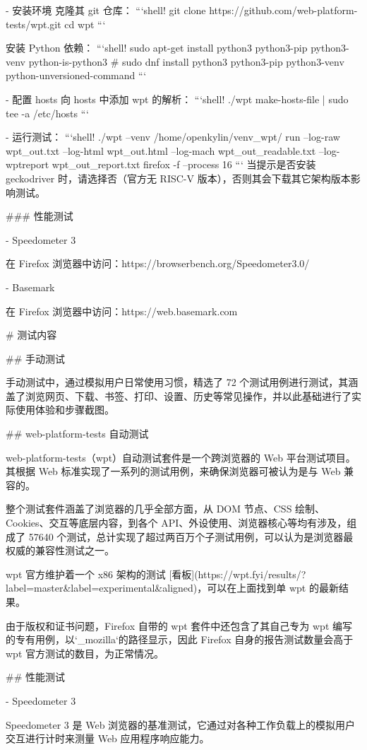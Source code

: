 \documentclass{article}
\begin{document}
\begin{markdown}
- 安装环境
克隆其 git 仓库：
```shell!
git clone https://github.com/web-platform-tests/wpt.git
cd wpt
```

安装 Python 依赖：
```shell!
sudo apt-get install python3 python3-pip python3-venv python-is-python3
# sudo dnf install python3 python3-pip python3-venv python-unversioned-command
```

- 配置 hosts
向 hosts 中添加 wpt 的解析：
```shell!
./wpt make-hosts-file | sudo tee -a /etc/hosts
```

- 运行测试：
```shell!
./wpt --venv /home/openkylin/venv_wpt/ run --log-raw wpt_out.txt --log-html wpt_out.html --log-mach wpt_out_readable.txt --log-wptreport wpt_out_report.txt firefox -f --process 16
```
当提示是否安装 geckodriver 时，请选择否（官方无 RISC-V 版本），否则其会下载其它架构版本影响测试。

### 性能测试

- Speedometer 3

在 Firefox 浏览器中访问：https://browserbench.org/Speedometer3.0/

- Basemark

在 Firefox 浏览器中访问：https://web.basemark.com

# 测试内容

## 手动测试

手动测试中，通过模拟用户日常使用习惯，精选了 72 个测试用例进行测试，其涵盖了浏览网页、下载、书签、打印、设置、历史等常见操作，并以此基础进行了实际使用体验和步骤截图。

## web-platform-tests 自动测试

web-platform-tests（wpt）自动测试套件是一个跨浏览器的 Web 平台测试项目。其根据 Web 标准实现了一系列的测试用例，来确保浏览器可被认为是与 Web 兼容的。

整个测试套件涵盖了浏览器的几乎全部方面，从 DOM 节点、CSS 绘制、Cookies、交互等底层内容，到各个 API、外设使用、浏览器核心等均有涉及，组成了 57640 个测试，总计实现了超过两百万个子测试用例，可以认为是浏览器最权威的兼容性测试之一。

wpt 官方维护着一个 x86 架构的测试 [看板](https://wpt.fyi/results/?label=master&label=experimental&aligned)，可以在上面找到单 wpt 的最新结果。

由于版权和证书问题，Firefox 自带的 wpt 套件中还包含了其自己专为 wpt 编写的专有用例，以`_mozilla`的路径显示，因此 Firefox 自身的报告测试数量会高于 wpt 官方测试的数目，为正常情况。

## 性能测试

- Speedometer 3

Speedometer 3 是 Web 浏览器的基准测试，它通过对各种工作负载上的模拟用户交互进行计时来测量 Web 应用程序响应能力。


\end{markdown}
\end{document}
